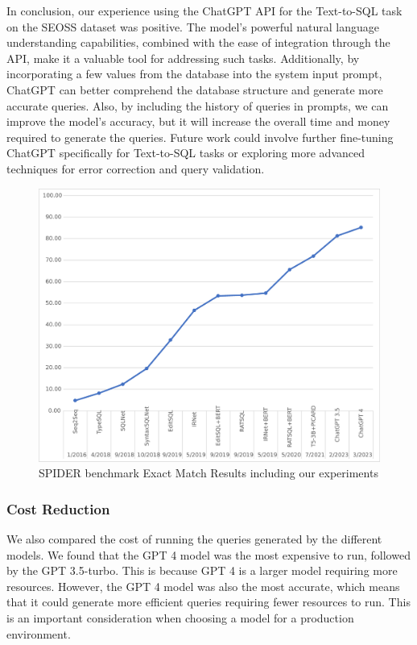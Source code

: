 In conclusion, our experience using the ChatGPT API for the Text-to-SQL task on the SEOSS dataset was positive. The model's powerful natural language understanding capabilities, combined with the ease of integration through the API, make it a valuable tool for addressing such tasks. Additionally, by incorporating a few values from the database into the system input prompt, ChatGPT can better comprehend the database structure and generate more accurate queries. Also, by including the history of queries in prompts, we can improve the model's accuracy, but it will increase the overall time and money required to generate the queries. Future work could involve further fine-tuning ChatGPT specifically for Text-to-SQL tasks or exploring more advanced techniques for error correction and query validation.

\begin{figure}[H]
    \centering
    \includegraphics[width=0.99\linewidth]{pics/benchmarkeps}
    \caption{SPIDER benchmark Exact Match Results including our experiments}
    \label{fig:benchmark}
\end{figure}

\subsubsection{Cost Reduction}

We also compared the cost of running the queries generated by the different models. We found that the \ac{GPT} 4 model was the most expensive to run, followed by the GPT 3.5-turbo. This is because GPT 4 is a larger model requiring more resources. However, the GPT 4 model was also the most accurate, which means that it could generate more efficient queries requiring fewer resources to run. This is an important consideration when choosing a model for a production environment.

